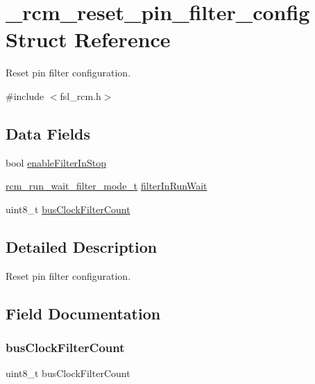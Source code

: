 \hypertarget{struct__rcm__reset__pin__filter__config}{}\section{\+\_\+rcm\+\_\+reset\+\_\+pin\+\_\+filter\+\_\+config Struct Reference}
\label{struct__rcm__reset__pin__filter__config}


Reset pin filter configuration.  




{\ttfamily \#include $<$fsl\+\_\+rcm.\+h$>$}

\subsection*{Data Fields}
\begin{DoxyCompactItemize}
\item 
bool \mbox{\hyperlink{struct__rcm__reset__pin__filter__config_aff8dcaa8b1dd6142618d5e99b6e36874}{enable\+Filter\+In\+Stop}}
\item 
\mbox{\hyperlink{group__rcm_gab04818291759684817621ea4afa2466d}{rcm\+\_\+run\+\_\+wait\+\_\+filter\+\_\+mode\+\_\+t}} \mbox{\hyperlink{struct__rcm__reset__pin__filter__config_afae01c1325f9d9d8ea5ec3a53ee6ecff}{filter\+In\+Run\+Wait}}
\item 
uint8\+\_\+t \mbox{\hyperlink{struct__rcm__reset__pin__filter__config_a6fbd9791c93466d7d4ff6a5e6dbe587e}{bus\+Clock\+Filter\+Count}}
\end{DoxyCompactItemize}


\subsection{Detailed Description}
Reset pin filter configuration. 

\subsection{Field Documentation}
\mbox{\label{struct__rcm__reset__pin__filter__config_a6fbd9791c93466d7d4ff6a5e6dbe587e}} 
\subsubsection{\texorpdfstring{busClockFilterCount}{busClockFilterCount}}
{\footnotesize\ttfamily uint8\+\_\+t bus\+Clock\+Filter\+Count}

